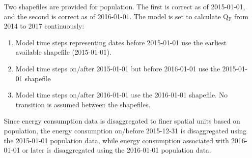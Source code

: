 \documentclass[letterpaper,10pt,english]{sphinxmanual}
\begin{document}
Two shapefiles are provided for population. The first is correct as of
2015-01-01, and the second is correct as of 2016-01-01. The model is set
to calculate Q$_{\text{F}}$ from 2014 to 2017 continuously:
\begin{enumerate}
\item {} 
Model time steps representing dates before 2015-01-01 use the
earliest available shapefile (2015-01-01).

\item {} 
Model time steps on/after 2015-01-01 but before 2016-01-01 use the
2015-01-01 shapefile

\item {} 
Model time steps on/after 2016-01-01 use the 2016-01-01 shapefile. No
transition is assumed between the shapefiles.

\end{enumerate}

Since energy consumption data is disaggregated to finer spatial units
based on population, the energy consumption on/before 2015-12-31 is
disaggregated using the 2015-01-01 population data, while energy
consumption associated with 2016-01-01 or later is disaggregated using
the 2016-01-01 population data.
\end{document}
